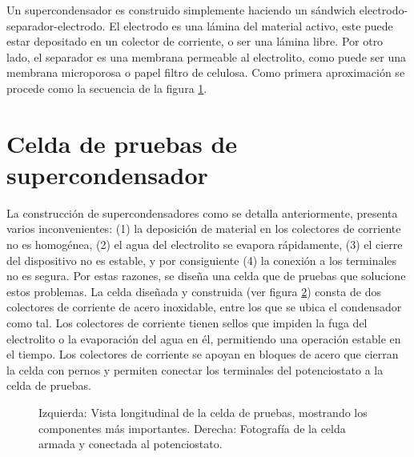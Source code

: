 Un supercondensador es construido simplemente haciendo un sándwich electrodo-separador-electrodo. El electrodo es una lámina del material activo, este puede estar depositado en un colector de corriente, o ser una lámina libre. Por otro lado, el separador es una membrana permeable al electrolito, como puede ser una membrana microporosa o papel filtro de celulosa. Como primera aproximación se procede como la secuencia de la figura \ref{fig:SC_process}. 

\begin{figure}[h!]
	\centering
	\caption{}
	\label{fig:SC_process}
\end{figure}

\section{Celda de pruebas de supercondensador}
La construcción de supercondensadores como se detalla anteriormente, presenta varios inconvenientes: (1) la deposición de material en los colectores de corriente no es homogénea, (2) el agua del electrolito se evapora rápidamente, (3) el cierre del dispositivo no es estable, y por consiguiente (4) la conexión a los terminales no es segura. Por estas razones, se diseña una celda que de pruebas que solucione estos problemas.
La celda diseñada y construida (ver figura \ref{fig:celda_de_pruebas_SC}) consta de dos colectores de corriente de acero inoxidable, entre los que se ubica el condensador como tal. Los colectores de corriente tienen sellos que impiden la fuga del electrolito o la evaporación del agua en él, permitiendo una operación estable en el tiempo. Los colectores de corriente se apoyan en bloques de acero que cierran la celda con pernos y permiten conectar los terminales del potenciostato a la celda de pruebas.

\begin{figure}[h!]
	\centering
	\caption[Celda de pruebas de supercondensador.]{Izquierda: Vista longitudinal de la celda de pruebas, mostrando los componentes más importantes. Derecha: Fotografía de la celda armada y conectada al potenciostato.}
	\label{fig:celda_de_pruebas_SC}
\end{figure}

